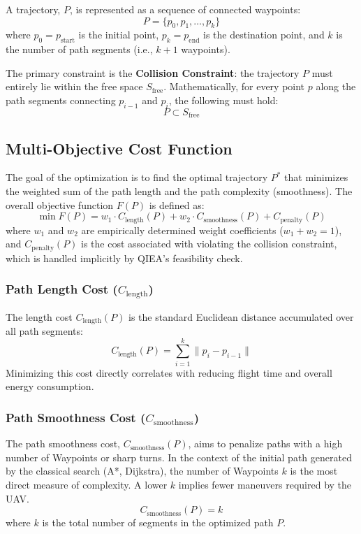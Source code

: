 A trajectory, $P$, is represented as a sequence of connected waypoints:
\begin{equation}
    P = \{p_0, p_1, \ldots, p_k\}
\end{equation}
where $p_0 = p_{\text{start}}$ is the initial point, $p_k = p_{\text{end}}$ is the destination point, and $k$ is the number of path segments (i.e., $k+1$ waypoints).

The primary constraint is the \textbf{Collision Constraint}: the trajectory $P$ must entirely lie within the free space $S_{\text{free}}$. Mathematically, for every point $p$ along the path segments connecting $p_{i-1}$ and $p_i$, the following must hold:
\begin{equation}
    P \subset S_{\text{free}}
\end{equation}


\subsection{Multi-Objective Cost Function}

The goal of the optimization is to find the optimal trajectory $P^*$ that minimizes the weighted sum of the path length and the path complexity (smoothness). The overall objective function $F(P)$ is defined as:
\begin{equation}
    \min F(P) = w_1 \cdot C_{\text{length}}(P) + w_2 \cdot C_{\text{smoothness}}(P) + C_{\text{penalty}}(P)
    \label{eq:total_cost}
\end{equation}
where $w_1$ and $w_2$ are empirically determined weight coefficients ($w_1+w_2=1$), and $C_{\text{penalty}}(P)$ is the cost associated with violating the collision constraint, which is handled implicitly by QIEA's feasibility check.

\subsubsection{Path Length Cost ($C_{\text{length}}$)}
The length cost $C_{\text{length}}(P)$ is the standard Euclidean distance accumulated over all path segments:
\begin{equation}
    C_{\text{length}}(P) = \sum_{i=1}^{k} \| p_i - p_{i-1} \|
    \label{eq:cost_length}
\end{equation}
Minimizing this cost directly correlates with reducing flight time and overall energy consumption.

\subsubsection{Path Smoothness Cost ($C_{\text{smoothness}}$)}
The path smoothness cost, $C_{\text{smoothness}}(P)$, aims to penalize paths with a high number of Waypoints or sharp turns. In the context of the initial path generated by the classical search (A*, Dijkstra), the number of Waypoints $k$ is the most direct measure of complexity. A lower $k$ implies fewer maneuvers required by the UAV.
\begin{equation}
    C_{\text{smoothness}}(P) = k
    \label{eq:cost_waypoints}
\end{equation}
where $k$ is the total number of segments in the optimized path $P$.

